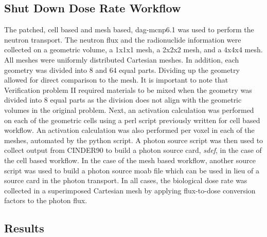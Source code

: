 \subsection{Shut Down Dose Rate Workflow}
The patched, cell based and mesh based, \gls{dag}-\gls{mcnp}6.1 was used to
perform the neutron transport. The neutron flux and the radionuclide
information were collected on a geometric volume, a 1x1x1 mesh, a 2x2x2 mesh,
and a 4x4x4 mesh. All meshes were uniformly distributed Cartesian meshes. In
addition, each geometry was divided into 8 and 64 equal parts. Dividing up the
geometry allowed for direct comparison to the mesh. It is important to note
that Verification problem II required materials to be mixed when the geometry
was divided into 8 equal parts as the division does not align with the geometric
volumes in the original problem.
Next, an activation calculation was performed on each of the geometric cells
using a perl script previously written for cell based workflow. An activation
calculation was also performed per voxel in each of the meshes, automated by
the python script.
A photon source script was then used to collect output from CINDER90 to
build a photon source card, \emph{sdef}, in the case of the cell based workflow.
In the case of the mesh based workflow, another source script was used to
build a photon source \gls{moab} file which can be used in lieu of a source card
in the photon transport.
In all cases, the biological dose rate was collected in a superimposed
Cartesian mesh by applying flux-to-dose conversion factors to the photon flux.
%
\subsection{Results}
